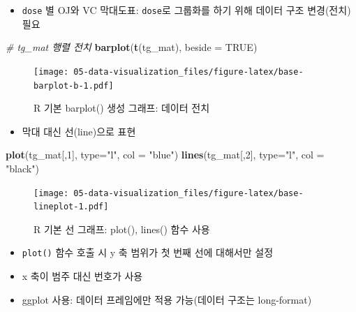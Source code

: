 \documentclass[
  11pt,
]{krantz}
\newenvironment{Shaded}{\begin{snugshade}}{\end{snugshade}}
\newcommand{\CommentTok}[1]{\textcolor[rgb]{0.37,0.37,0.37}{\textit{#1}}}
\newcommand{\DataTypeTok}[1]{\textcolor[rgb]{0.27,0.27,0.27}{#1}}
\newcommand{\DecValTok}[1]{\textcolor[rgb]{0.06,0.06,0.06}{#1}}
\newcommand{\KeywordTok}[1]{\textcolor[rgb]{0.27,0.27,0.27}{\textbf{#1}}}
\newcommand{\NormalTok}[1]{#1}
\newcommand{\OtherTok}[1]{\textcolor[rgb]{0.37,0.37,0.37}{#1}}
\newcommand{\StringTok}[1]{\textcolor[rgb]{0.5,0.5,0.5}{#1}}
\providecommand{\tightlist}{%
  \setlength{\itemsep}{0pt}\setlength{\parskip}{0pt}}
\begin{document}
\normalsize

\begin{itemize}
\tightlist
\item
  \texttt{dose} 별 OJ와 VC 막대도표: \texttt{dose}로 그룹화를 하기 위해 데이터 구조 변경(전치) 필요
\end{itemize}

\footnotesize

\begin{Shaded}
\begin{Highlighting}[]
\CommentTok{# tg_mat 행렬 전치}
\KeywordTok{barplot}\NormalTok{(}\KeywordTok{t}\NormalTok{(tg_mat), }\DataTypeTok{beside =} \OtherTok{TRUE}\NormalTok{)}
\end{Highlighting}
\end{Shaded}

\begin{figure}
\centering
\texttt{[image: 05-data-visualization\_files/figure-latex/base-barplot-b-1.pdf]}
\caption{\label{fig:base-barplot-b}R 기본 barplot() 생성 그래프: 데이터 전치}
\end{figure}

\normalsize

\begin{itemize}
\tightlist
\item
  막대 대신 선(line)으로 표현
\end{itemize}

\footnotesize

\begin{Shaded}
\begin{Highlighting}[]
\KeywordTok{plot}\NormalTok{(tg_mat[,}\DecValTok{1}\NormalTok{], }\DataTypeTok{type=}\StringTok{"l"}\NormalTok{, }\DataTypeTok{col =} \StringTok{"blue"}\NormalTok{)}
\KeywordTok{lines}\NormalTok{(tg_mat[,}\DecValTok{2}\NormalTok{], }\DataTypeTok{type=}\StringTok{"l"}\NormalTok{, }\DataTypeTok{col =} \StringTok{"black"}\NormalTok{)}
\end{Highlighting}
\end{Shaded}

\begin{figure}
\centering
\texttt{[image: 05-data-visualization\_files/figure-latex/base-lineplot-1.pdf]}
\caption{\label{fig:base-lineplot}R 기본 선 그래프: plot(), lines() 함수 사용}
\end{figure}

\normalsize

\begin{itemize}
\tightlist
\item
  \texttt{plot()} 함수 호출 시 y 축 범위가 첫 번째 선에 대해서만 설정
\item
  x 축이 범주 대신 번호가 사용
\item
  ggplot 사용: 데이터 프레임에만 적용 가능(데이터 구조는 long-format)
\end{itemize}
\end{document}
